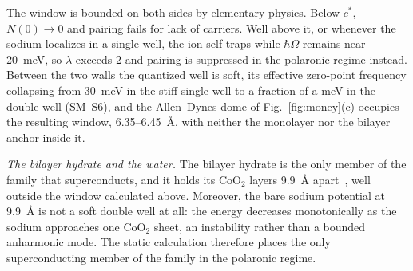 \documentclass[aps,prl,twocolumn,superscriptaddress,floatfix]{revtex4-2}
\begin{document}
The window is bounded on both sides by elementary physics. Below $c^\ast$,
$N(0)\to0$ and pairing fails for lack of carriers. Well above it, or whenever the sodium localizes
in a single well, the ion self-traps while $\hbar\Omega$ remains near 20~meV, so $\lambda$ exceeds
2 and pairing is suppressed in the polaronic regime instead. Between the two walls the quantized
well is soft, its effective zero-point frequency collapsing from 30~meV in the stiff single well
to a fraction of a meV in the double well (SM~S6), and the Allen--Dynes dome of
Fig.~\ref{fig:money}(c)
occupies the resulting window, 6.35--6.45~\AA, with neither the monolayer nor the bilayer anchor
inside it. 

\textit{The bilayer hydrate and the water.} The bilayer hydrate is the only member of the family
that superconducts, and it holds its CoO$_2$ layers 9.9~\AA{} apart~\cite{Jorgensen2003}, well
outside the window calculated above. Moreover, the bare sodium potential at 9.9~\AA{} is not a
soft double well at all: the energy decreases monotonically as the sodium approaches one CoO$_2$
sheet, an instability rather than a bounded anharmonic mode. The static calculation therefore
places the only superconducting member of the family in the polaronic regime. 
\end{document}
